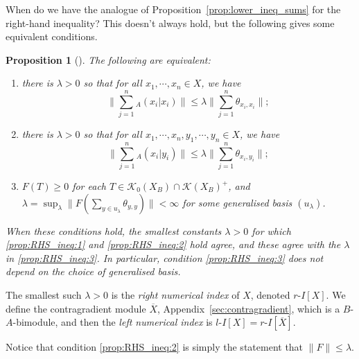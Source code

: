 \documentclass[a4paper,11pt]{article}
\theoremstyle{plain}
\newtheorem{proposition}{Proposition}[section]
\theoremstyle{remark}
\newcommand{\mc}[1]{\mathcal{#1}}
\begin{document}
When do we have the analogue of Proposition~\ref{prop:lower_ineq_sums} for the right-hand inequality?  This doesn't always hold, but the following gives some equivalent conditions.

\begin{proposition}[{\cite[Proposition~2.7]{KPW_JonesIndexTheory}}]\label{prop:RHS_ineq}
The following are equivalent:
\begin{enumerate}
  \item\label{prop:RHS_ineq:1} there is $\lambda>0$ so that for all $x_1,\cdots,x_n\in X$, we have
  \[ \Big\| \sum_{j=1}^n {}_A(x_i|x_i) \Big\| \leq \lambda \Big\| \sum_{j=1}^n \theta_{x_i,x_i} \Big\|; \]
  \item\label{prop:RHS_ineq:2} there is $\lambda>0$ so that for all $x_1,\cdots,x_n,y_1,\cdots,y_n\in X$, we have
  \[ \Big\| \sum_{j=1}^n {}_A(x_i|y_i) \Big\| \leq \lambda \Big\| \sum_{j=1}^n \theta_{x_i,y_i} \Big\|; \]
  \item\label{prop:RHS_ineq:3} $F(T)\geq 0$ for each $T\in\mc K_0(X_B) \cap \mc K(X_B)^+$, and $\lambda = \sup_{\lambda} \big\| F(\sum_{y\in u_\lambda} \theta_{y,y}) \big\| < \infty$ for some generalised basis $(u_\lambda)$.
\end{enumerate}
When these conditions hold, the smallest constants $\lambda>0$ for which \ref{prop:RHS_ineq:1} and \ref{prop:RHS_ineq:2} hold agree, and these agree with the $\lambda$ in \ref{prop:RHS_ineq:3}.  In particular, condition \ref{prop:RHS_ineq:3} does not depend on the choice of generalised basis.
\end{proposition}

The smallest such $\lambda>0$ is the \emph{right numerical index} of $X$, denoted $r\text{-}I[X]$.  We define the contragradient module $\overline X$, Appendix~\ref{sec:contragradient}, which is a $B$-$A$-bimodule, and then the \emph{left numerical index} is $l\text{-}I[X] = r\text{-}I[\overline X]$.

Notice that condition \ref{prop:RHS_ineq:2} is simply the statement that $\|F\|\leq\lambda$.
\end{document}
